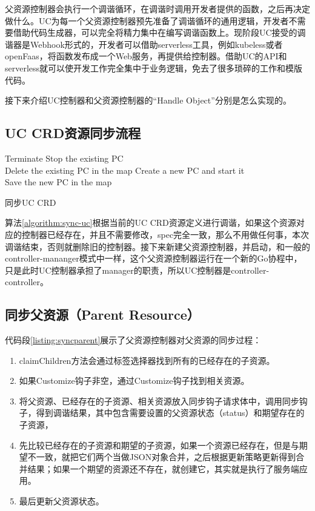 \documentclass[macfonts,master]{njuthesis}
\begin{document}
父资源控制器会执行一个调谐循环，在调谐时调用开发者提供的函数，之后再决定做什么。UC为每一个父资源控制器预先准备了调谐循环的通用逻辑，开发者不需要借助代码生成器，可以完全将精力集中在编写调谐函数上。现阶段UC接受的调谐器是Webhook形式的，开发者可以借助serverless工具，例如kubeless或者openFaas，将函数发布成一个Web服务，再提供给控制器。借助UC的API和serverless就可以使开发工作完全集中于业务逻辑，免去了很多琐碎的工作和模版代码。


接下来介绍UC控制器和父资源控制器的``Handle Object''分别是怎么实现的。

\subsection{UC CRD资源同步流程}

\begin{algorithm}[H]
\small
\DontPrintSemicolon
    {
        {Terminate}
       	\Else
       	{
          Stop the existing PC\\
          Delete the existing PC in the map
        }
    }
  \Else
  {
    Create a new PC and start it\\
    Save the new PC in the map   
  } 
\caption{同步UC CRD}
\label{algorithm:sync-uc}
\end{algorithm}

算法\ref{algorithm:sync-uc}根据当前的UC CRD资源定义进行调谐，如果这个资源对应的控制器已经存在，并且不需要修改，spec完全一致，那么不用做任何事，本次调谐结束，否则就删除旧的控制器。接下来新建父资源控制器，并启动，和一般的controller-mananger模式中一样，这个父资源控制器运行在一个新的Go协程中，只是此时UC控制器承担了manager的职责，所以UC控制器是controller-controller。

\subsection{同步父资源（Parent Resource）}


代码段\ref{listing:syncparent}展示了父资源控制器对父资源的同步过程：
\begin{enumerate}
	\item claimChildren方法会通过标签选择器找到所有的已经存在的子资源。
	\item 如果Customize钩子非空，通过Customize钩子找到相关资源。
	\item 将父资源、已经存在的子资源、相关资源放入同步钩子请求体中，调用同步钩子，得到调谐结果，其中包含需要设置的父资源状态（status）和期望存在的子资源，
	\item 先比较已经存在的子资源和期望的子资源，如果一个资源已经存在，但是与期望不一致，就把它们两个当做JSON对象合并，之后根据更新策略更新得到合并结果；如果一个期望的资源还不存在，就创建它，其实就是执行了服务端应用。
	\item 最后更新父资源状态。
\end{enumerate}
\end{document}
